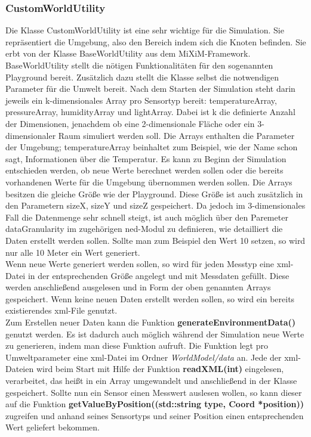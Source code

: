 \subsubsection{CustomWorldUtility}

Die Klasse CustomWorldUtility ist eine sehr wichtige für die Simulation. Sie repräsentiert die Umgebung, also den Bereich indem sich die Knoten befinden. Sie erbt von der Klasse BaseWorldUtility aus dem MiXiM-Framework. BaseWorldUtility stellt die nötigen Funktionalitäten für den sogenannten Playground bereit. \newline
Zusätzlich dazu stellt die Klasse selbst die notwendigen Parameter für die Umwelt bereit. Nach dem Starten der Simulation steht darin jeweils ein k-dimensionales Array pro Sensortyp bereit: temperatureArray, pressureArray, humidityArray und lightArray. Dabei ist k die definierte Anzahl der Dimensionen, jenachdem ob eine 2-dimensionale Fläche oder ein 3-dimensionaler Raum simuliert werden soll. Die Arrays enthalten die Parameter der Umgebung; temperatureArray beinhaltet zum Beispiel, wie der Name schon sagt, Informationen über die Temperatur. \newline
Es kann zu Beginn der Simulation entschieden werden, ob neue Werte berechnet werden sollen oder die bereits vorhandenen Werte für die Umgebung übernommen werden sollen. Die Arrays besitzen die gleiche Größe wie der Playground. Diese Größe ist auch zusätzlich in den Parametern sizeX, sizeY und sizeZ gespeichert. \newline
Da jedoch im 3-dimensionales Fall die Datenmenge sehr schnell steigt, ist auch möglich über den Paremeter dataGranularity im zugehörigen ned-Modul zu definieren, wie detailliert die Daten erstellt werden sollen. Sollte man zum Beispiel den Wert 10 setzen, so wird nur alle 10 Meter ein Wert generiert.\\
Wenn neue Werte generiert werden sollen, so wird für jeden Messtyp eine xml-Datei in der entsprechenden Größe angelegt und mit Messdaten gefüllt. Diese werden anschließend ausgelesen und in Form der oben genannten Arrays gespeichert. Wenn keine neuen Daten erstellt werden sollen, so wird ein bereits existierendes xml-File genutzt.\\
Zum Erstellen neuer Daten kann die Funktion \textbf{generateEnvironmentData()} genutzt werden. Es ist dadurch auch möglich während der Simulation neue Werte zu generieren, indem man diese Funktion aufruft. Die Funktion legt pro Umweltparameter eine xml-Datei im Ordner \textit{WorldModel/data} an. Jede der xml-Dateien wird beim Start mit Hilfe der Funktion \textbf{readXML(int)} eingelesen, verarbeitet, das heißt in ein Array umgewandelt und anschließend in der Klasse gespeichert. \newline
Sollte nun ein Sensor einen Messwert auslesen wollen, so kann dieser auf die Funktion \textbf{getValueByPosition((std::string type, Coord *position))} zugreifen und anhand seines Sensortyps und seiner Position einen entsprechenden Wert geliefert bekommen.

